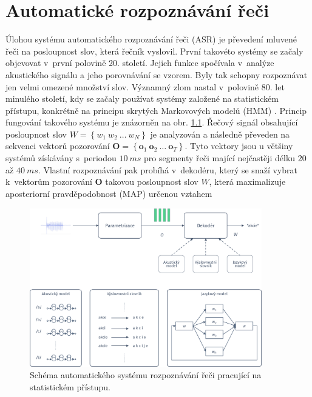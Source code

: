 \chapter{Automatické rozpoznávání řeči}
\label{chap:asr}

Úlohou systému automatického rozpoznávání řeči (ASR) je převedení mluvené řeči na posloupnost slov, která řečník vyslovil. První takovéto systémy se začaly objevovat v~první polovině 20. století. Jejich funkce spočívala v~analýze akustického signálu a jeho porovnávání se vzorem. Byly tak schopny rozpoznávat jen velmi omezené množství slov. Významný zlom nastal v~polovině 80. let minulého století, kdy se začaly používat systémy založené na statistickém přístupu, konkrétně na principu skrytých Markovových modelů (HMM) \cite{Holmes2001}. Princip fungování takového systému je znázorněn na obr. \ref{fig:asr:decoding}. Řečový signál obsahující posloupnost slov $W = \left\{ w_1\ w_2\ \dots\ w_N \right\}$ je analyzován a následně převeden na sekvenci vektorů pozorování $\boldsymbol{O} = \left\{\boldsymbol{o}_1\ \boldsymbol{o}_2\ \dots\ \boldsymbol{o}_T\right\}$. Tyto vektory jsou u většiny systémů získávány s~periodou $10\ ms$ pro segmenty řeči mající nejčastěji délku $20$ až $40\ ms$. Vlastní rozpoznávání pak probíhá v~dekodéru, který se snaží vybrat  k~vektorům pozorování $\boldsymbol{O}$ takovou posloupnost slov $\hat{W}$, která maximalizuje aposteriorní pravděpodobnost (MAP) určenou vztahem

\begin{figure}[hbpt]
  \centering
  \includegraphics[width=0.9\textwidth]{./ch4-asr/img/decoding.pdf}
  \caption[Schéma ASR systému pracující se statistickou.]{Schéma automatického systému rozpoznávání řeči pracující na statistickém přístupu.}
  \label{fig:asr:decoding}
\end{figure}

